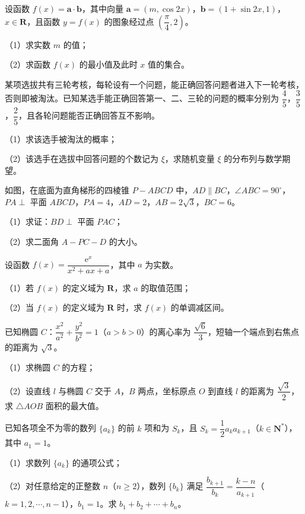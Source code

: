 \begin{question}
设函数 $f(x)=\boldsymbol a\cdot\boldsymbol b$，其中向量 $\boldsymbol a=(m,\cos2x)$，$\boldsymbol b=(1+\sin2x,1)$，$x\in\mathbf R$，且函数 $y=f(x)$ 的图象经过点 $\left(\dfrac{\pi}{4},2\right)$。

（1）求实数 $m$ 的值；

（2）求函数 $f(x)$ 的最小值及此时 $x$ 值的集合。

\end{question}
\begin{question}
某项选拔共有三轮考核，每轮设有一个问题，能正确回答问题者进入下一轮考核，否则即被淘汰。已知某选手能正确回答第一、二、三轮的问题的概率分别为 $\dfrac45$，$\dfrac35$，$\dfrac25$，且各轮问题能否正确回答互不影响。

（1）求该选手被淘汰的概率；

（2）该选手在选拔中回答问题的个数记为 $\xi$，求随机变量 $\xi$ 的分布列与数学期望。

\Needspace{0.4\textheight}
\end{question}
\begin{question}
如图，在底面为直角梯形的四棱锥 $P-ABCD$ 中，$AD\parallel BC$，$\angle ABC=90^\circ$，$PA\perp$ 平面 $ABCD$，$PA=4$，$AD=2$，$AB=2\sqrt3$，$BC=6$。

（1）求证：$BD\perp$ 平面 $PAC$；

（2）求二面角 $A-PC-D$ 的大小。
\nopagebreak[4]
\begin{center}\end{center}
\nopagebreak[4]
\end{question}
\begin{question}
设函数 $f(x)=\dfrac{\mathrm e^x}{x^2+ax+a}$，其中 $a$ 为实数。

（1）若 $f(x)$ 的定义域为 $\mathbf R$，求 $a$ 的取值范围；

（2）当 $f(x)$ 的定义域为 $\mathbf R$ 时，求 $f(x)$ 的单调减区间。

\end{question}
\begin{question}
已知椭圆 $C$：$\dfrac{x^2}{a^2}+\dfrac{y^2}{b^2}=1$（$a>b>0$）的离心率为 $\dfrac{\sqrt6}{3}$，短轴一个端点到右焦点的距离为 $\sqrt3$。

（1）求椭圆 $C$ 的方程；

（2）设直线 $l$ 与椭圆 $C$ 交于 $A$，$B$ 两点，坐标原点 $O$ 到直线 $l$ 的距离为 $\dfrac{\sqrt3}{2}$，求 $\triangle AOB$ 面积的最大值。

\end{question}
\begin{question}
已知各项全不为零的数列 $\{a_k\}$ 的前 $k$ 项和为 $S_k$，且 $S_k=\dfrac12a_ka_{k+1}$（$k\in\mathbf N^*$），其中 $a_1=1$。

（1）求数列 $\{a_k\}$ 的通项公式；

（2）对任意给定的正整数 $n$（$n\geqslant2$），数列 $\{b_k\}$ 满足 $\dfrac{b_{k+1}}{b_k}=\dfrac{k-n}{a_{k+1}}$（$k=1,2,\cdots,n-1$），$b_1=1$。求 $b_1+b_2+\cdots+b_n$。

\end{question}